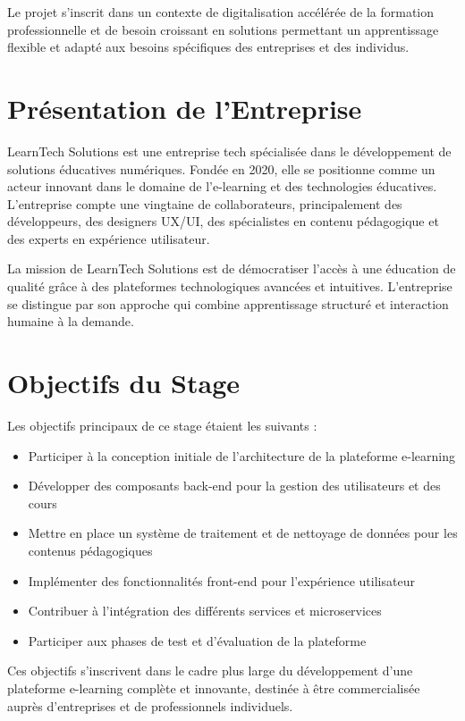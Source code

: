 \documentclass[12pt, a4paper]{report}
\begin{document}
Le projet s'inscrit dans un contexte de digitalisation accélérée de la formation professionnelle et de besoin croissant en solutions permettant un apprentissage flexible et adapté aux besoins spécifiques des entreprises et des individus.

\section{Présentation de l'Entreprise}
LearnTech Solutions est une entreprise tech spécialisée dans le développement de solutions éducatives numériques. Fondée en 2020, elle se positionne comme un acteur innovant dans le domaine de l'e-learning et des technologies éducatives. L'entreprise compte une vingtaine de collaborateurs, principalement des développeurs, des designers UX/UI, des spécialistes en contenu pédagogique et des experts en expérience utilisateur.

La mission de LearnTech Solutions est de démocratiser l'accès à une éducation de qualité grâce à des plateformes technologiques avancées et intuitives. L'entreprise se distingue par son approche qui combine apprentissage structuré et interaction humaine à la demande.

\section{Objectifs du Stage}
Les objectifs principaux de ce stage étaient les suivants :

\begin{itemize}
  \item Participer à la conception initiale de l'architecture de la plateforme e-learning
  \item Développer des composants back-end pour la gestion des utilisateurs et des cours
  \item Mettre en place un système de traitement et de nettoyage de données pour les contenus pédagogiques
  \item Implémenter des fonctionnalités front-end pour l'expérience utilisateur
  \item Contribuer à l'intégration des différents services et microservices
  \item Participer aux phases de test et d'évaluation de la plateforme
\end{itemize}

Ces objectifs s'inscrivent dans le cadre plus large du développement d'une plateforme e-learning complète et innovante, destinée à être commercialisée auprès d'entreprises et de professionnels individuels.
\end{document}
